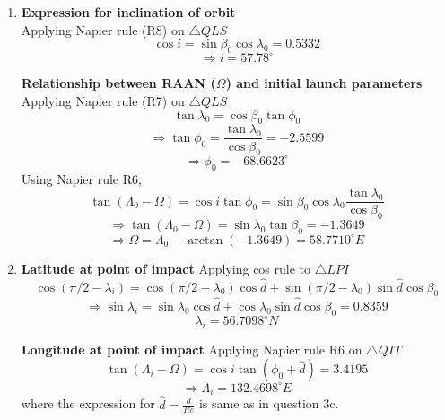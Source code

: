 \begin{enumerate}[label=(\alph*)]
\item
\textbf{Expression for inclination of orbit}\\

Applying Napier rule (R8) on $\triangle QLS$
$$\cos i = \sin\beta_0 \cos\lambda_0=0.5332$$
$$\Rightarrow i=57.78^\circ $$

\textbf{Relationship between RAAN ($\Omega$) and initial launch parameters}\\

Applying Napier rule (R7) on $\triangle QLS$
$$\tan \lambda_0 = \cos\beta_0 \tan\phi_0$$
$$\Rightarrow \tan \phi_0 = \frac{\tan\lambda_0}{\cos\beta_0}=-2.5599$$
$$\Rightarrow \phi_0=-68.6623^\circ$$
Using Napier rule R6,
$$\tan(\Lambda_0-\Omega)=\cos i \tan\phi_0 = \sin\beta_0 \cos\lambda_0\frac{\tan\lambda_0}{\cos\beta_0}$$
$$\Rightarrow \tan(\Lambda_0-\Omega)=\sin\lambda_0 \tan\beta_0=-1.3649$$
$$\Rightarrow \Omega=\Lambda_0-\arctan(-1.3649)=58.7710^\circ E$$
\item
\textbf{Latitude at point of impact}
Applying cos rule to  $\triangle LPI$
$$\cos(\pi/2-\lambda_i)=\cos(\pi/2-\lambda_0)\cos\hat{d}+\sin(\pi/2-\lambda_0)\sin\hat{d}\cos\beta_0$$
$$\Rightarrow \sin\lambda_i = \sin\lambda_0\cos\hat{d}+\cos\lambda_0\sin\hat{d}\cos\beta_0=0.8359$$
$$\lambda_i=56.7098^\circ N$$

\textbf{Longitude at point of impact}
Applying Napier rule R6 on $\triangle QIT$
$$\tan(\Lambda_i-\Omega)=\cos i \tan(\phi_0+\hat{d})=3.4195$$
$$\Rightarrow \Lambda_i = 132.4698^\circ E$$
where the expression for $\hat{d}=\frac{d}{Re}$ is same as in question 3c.
\end{enumerate}